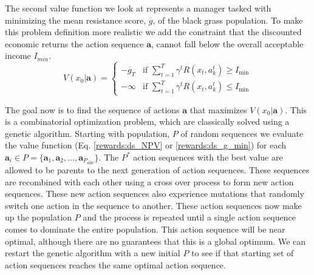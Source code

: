 \documentclass[12pt, a4paper]{article}
\begin{document}
The second value function we look at represents a manager tasked with minimizing the mean resistance score, $\overline{g}$, of the black grass population. To make this problem definition more realistic we add the constraint that the discounted economic returns the action sequence $\mathbf{a}$, cannot fall below the overall acceptable income $I_{min}$.   
\begin{equation}\label{rewards:ds_g_min}
	V(x_0|\mathbf{a}) = \begin{cases}
	-\overline{g}_T &\text{if } \sum_{t = 1}^{T} \gamma^t R(x_t, a_k^t) \geq I_\text{min}\\
	-\infty &\text{if } \sum_{t = 1}^{T} \gamma^t R(x_t, a_k^t) \leq I_\text{min}    
	\end{cases}  
\end{equation}

The goal now is to find the sequence of actions $\mathbf{a}$ that maximizes $V(x_0|\mathbf{a})$. This is a combinatorial optimization problem, which are classically solved using a genetic algorithm. Starting with population, $P$ of random sequences we evaluate the value function (Eq. \ref{rewards:ds_NPV} or \ref{rewards:ds_g_min}) for each $\mathbf{a}_i \in P = \{\mathbf{a}_1, \mathbf{a}_2, ..., \mathbf{a}_{P_\text{size}}\}$. The $P^*$ action sequences with the best value are allowed to be parents to the next generation of action sequences. These sequences are recombined with each other using a cross over process to form new action sequences. These new action sequences also experience mutations that randomly switch one action in the sequence to another. These action sequences now make up the population $P$ and the process is repeated until a single action sequence comes to dominate the entire population. This action sequence will be near optimal, although there are no guarantees that this is a global optimum. We can restart the genetic algorithm with a new initial $P$ to see if that starting set of action sequences reaches the same optimal action sequence. 
\end{document}
